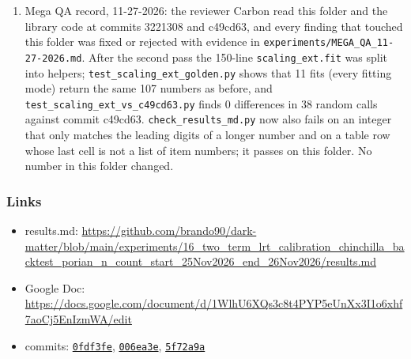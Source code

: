 \begin{enumerate}
  \item Mega QA record, 11-27-2026: the reviewer Carbon read this folder and the library code at commits 3221308 and c49cd63, and every finding that touched this folder was fixed or rejected with evidence in \texttt{experiments/\allowbreak{}MEGA\_\allowbreak{}QA\_\allowbreak{}11-27-2026.md}. After the second pass the 150-line \texttt{scaling\_\allowbreak{}ext.fit} was split into helpers; \texttt{test\_\allowbreak{}scaling\_\allowbreak{}ext\_\allowbreak{}golden.py} shows that 11 fits (every fitting mode) return the same 107 numbers as before, and \texttt{test\_\allowbreak{}scaling\_\allowbreak{}ext\_\allowbreak{}vs\_\allowbreak{}c49cd63.py} finds 0 differences in 38 random calls against commit c49cd63. \texttt{check\_\allowbreak{}results\_\allowbreak{}md.py} now also fails on an integer that only matches the leading digits of a longer number and on a table row whose last cell is not a list of item numbers; it passes on this folder. No number in this folder changed.
\end{enumerate}

\subsubsection*{Links}
\begin{itemize}\raggedright
  \item results.md: \url{https://github.com/brando90/dark-matter/blob/main/experiments/16_two_term_lrt_calibration_chinchilla_backtest_porian_n_count_start_25Nov2026_end_26Nov2026/results.md}
  \item Google Doc: \url{https://docs.google.com/document/d/1WlhU6XQs3c8t4PYP5eUnXx3I1o6xhf7aoCj5EnIzmWA/edit}
  \item commits: \href{https://github.com/brando90/dark-matter/commit/0fdf3fe}{\texttt{0fdf3fe}}, \href{https://github.com/brando90/dark-matter/commit/006ea3e}{\texttt{006ea3e}}, \href{https://github.com/brando90/dark-matter/commit/5f72a9a}{\texttt{5f72a9a}}
\end{itemize}

